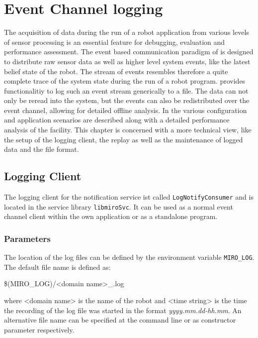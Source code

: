 \chapter{Event Channel logging}
\label{sec:ecLogging}

The acquisition of data during the run of a robot application from
various levels of sensor processing is an essential feature for
debugging, evaluation and performance assessment. The event based
communication paradigm of \miro is designed to distribute raw sensor
data as well as higher level system events, like the latest belief
state of the robot. The stream of events resembles therefore a quite
complete trace of the system state during the run of a robot program.
\miro provides functionalitiy to log such an event stream generically
to a file. The data can not only be reread into the system, but the
events can also be redistributed over the event channel, allowing for
detailed offline analysis. In \cite{Utz+Mayer+Kraetzschmar:04} the
various configuration and application scenarios are described along
with a detailed performance analysis of the facility. This chapter is
concerned with a more technical view, like the setup of the logging
client, the replay as well as the maintenance of logged data and the
file format.

\section{Logging Client}

The logging client for the notification service ist called
\texttt{LogNotifyConsumer} and is located in the service library
\texttt{libmiroSvc}. It can be used as a normal event channel client
within the own application or as a standalone program.

\subsection{Parameters}

The location of the log files can be defined by the environment
variable \texttt{MIRO\_LOG}. The default file name is defined as:

\$(MIRO\_LOG)/<domain name>\_<time string>.log

where <domain name> is the name of the robot and <time string> is the
time the recording of the log file was started in the format
\emph{yyyy.mm.dd-hh.mm}. An alternative file name can be specified at
the command line or as constructor parameter respectively.

